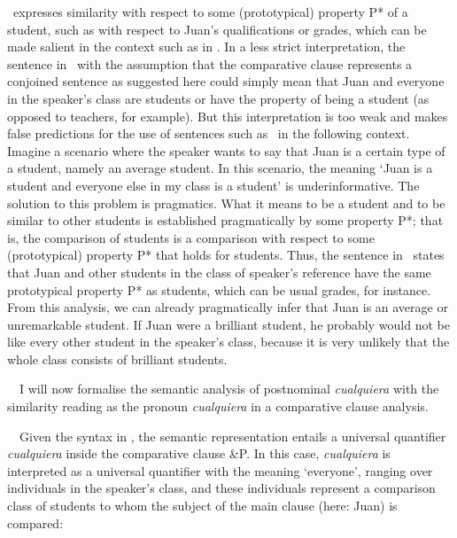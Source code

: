 \documentclass[10pt]{article}
\newenvironment{styleStandard}{\renewcommand\baselinestretch{1.25}\setlength\leftskip{0cm}\setlength\rightskip{0cm}\setlength\parindent{0cm}\setlength\parfillskip{0pt plus 1fil}\setlength\parskip{0in plus 1pt}\writerlistparindent\writerlistleftskip\leavevmode\normalfont\normalsize\fontsize{12pt}{14.4pt}\selectfont\writerlistlabel\ignorespaces}{\unskip\vspace{0in plus 1pt}\par}
\newcommand\writerlistleftskip{}
\newcommand\writerlistparindent{}
\newcommand\writerlistlabel{}
\begin{document}
\begin{styleStandard}
\ expresses similarity with respect to some (prototypical) property P* of a student, such as with respect to Juan’s qualifications or grades, which can be made salient in the context such as in . In a less strict interpretation, the sentence in \ with the assumption that the comparative clause represents a conjoined sentence as suggested here could simply mean that Juan and everyone in the speaker’s class are students or have the property of being a student (as opposed to teachers, for example). But this interpretation is too weak and makes false predictions for the use of sentences such as \ in the following context. Imagine a scenario where the speaker wants to say that Juan is a certain type of a student, namely an average student. In this scenario, the meaning ‘Juan is a student and everyone else in my class is a student’ is underinformative. The solution to this problem is pragmatics. What it means to be a student and to be similar to other students is established pragmatically by some property P*; that is, the comparison of students is a comparison with respect to some (prototypical) property P* that holds for students. Thus, the sentence in \ states that Juan and other students in the class of speaker’s reference have the same prototypical property P* as students, which can be usual grades, for instance. From this analysis, we can already pragmatically infer that Juan is an average or unremarkable student. If Juan were a brilliant student, he probably would not be like every other student in the speaker’s class, because it is very unlikely that the whole class consists of brilliant students. 
\end{styleStandard}

\begin{styleStandard}
\ \ I will now formalise the semantic analysis of postnominal \textit{cualquiera} with the similarity reading as the pronoun \textit{cualquiera} in a comparative clause analysis.
\end{styleStandard}

\begin{styleStandard}
\ \ Given the syntax in , the semantic representation entails a universal quantifier \textit{cualquiera} inside the comparative clause \&P. In this case, \textit{cualquiera} is interpreted as a universal quantifier with the meaning ‘everyone’, ranging over individuals in the speaker’s class, and these individuals represent a comparison class of students to whom the subject of the main clause (here: Juan) is compared:
\end{styleStandard}
\end{document}
